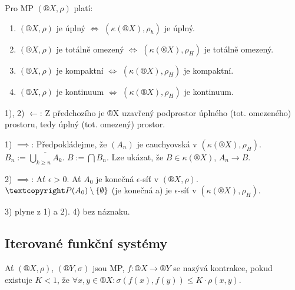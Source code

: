 \documentclass[12pt]{article}					%
\begin{document}
    \begin{veta}
        Pro MP $(®X, \rho)$ platí:

        \begin{enumerate}
            \item $(®X, \rho)$ je úplný $\Leftrightarrow$ $(\kappa(®X), \rho_h)$ je úplný.
            \item $(®X, \rho)$ je totálně omezený $\Leftrightarrow$ $(\kappa(®X), \rho_H)$ je totálně omezený.
            \item $(®X, \rho)$ je kompaktní $\Leftrightarrow$ $(\kappa(®X), \rho_H)$ je kompaktní.
            \item $(®X, \rho)$ je kontinuum $\Leftrightarrow$ $(\kappa(®X), \rho_H)$ je kontinuum.
        \end{enumerate}

        \begin{dukazin}
                1), 2) $\leftarrow$: Z předchozího je ®X uzavřený podprostor úplného (tot. omezeného) prostoru, tedy úplný (tot. omezený) prostor.

                1) $\implies$: Předpokládejme, že $(A_n)$ je cauchyovská v $(\kappa(®X), \rho_H)$. $B_n := \overline{\bigcup_{k ≥ n} A_k}$. $B := \bigcap B_n$. Lze ukázat, že $B \in \kappa(®X)$, $A_n \rightarrow B$.

                2) $\implies$: Ať $\epsilon > 0$. Ať $A_0$ je konečná $\epsilon$-síť v $(®X, \rho)$. $©P(A_0)\setminus \{\O\}$ (je konečná a) je $\epsilon$-síť v $(\kappa(®X), \rho_H)$.

                3) plyne z 1) a 2). 4) bez náznaku.
        \end{dukazin}
    \end{veta}

    \subsection{Iterované funkční systémy}
        \begin{definice}
            Ať $(®X, \rho)$, $(®Y, \sigma)$ jsou MP, $f: ®X \rightarrow ®Y$ se nazývá kontrakce, pokud existuje $K < 1$, že $\forall x, y \in ®X: \sigma(f(x), f(y)) ≤ K·\rho(x, y)$.
        \end{definice}
\end{document}
